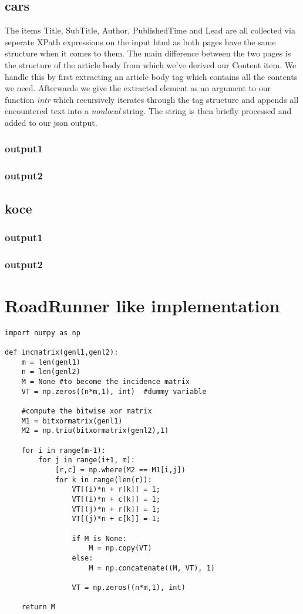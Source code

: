 \documentclass[runningheads]{llncs}
\begin{document}
\subsection{cars}
The items Title, SubTitle, Author, PublishedTime and Lead are all collected via seperate XPath expressions on the input html as both pages have the same structure when it comes to them. The main difference between the two pages is the structure of the article body from which we've derived our Content item. We handle this by first extracting an article body tag which contains all the contents we need. Afterwards we give the extracted element as an argument to our function \textit{intr} which recursively iterates through the tag structure and appends all encountered text into a \textit{nonlocal} string. The string is then briefly processed and added to our json output.
\subsubsection{output1}
\subsubsection{output2}
\subsection{koce}
\subsubsection{output1}
\subsubsection{output2}
\section{RoadRunner like implementation}
\begin{lstlisting}
import numpy as np
 
def incmatrix(genl1,genl2):
    m = len(genl1)
    n = len(genl2)
    M = None #to become the incidence matrix
    VT = np.zeros((n*m,1), int)  #dummy variable
 
    #compute the bitwise xor matrix
    M1 = bitxormatrix(genl1)
    M2 = np.triu(bitxormatrix(genl2),1) 
 
    for i in range(m-1):
        for j in range(i+1, m):
            [r,c] = np.where(M2 == M1[i,j])
            for k in range(len(r)):
                VT[(i)*n + r[k]] = 1;
                VT[(i)*n + c[k]] = 1;
                VT[(j)*n + r[k]] = 1;
                VT[(j)*n + c[k]] = 1;
 
                if M is None:
                    M = np.copy(VT)
                else:
                    M = np.concatenate((M, VT), 1)
 
                VT = np.zeros((n*m,1), int)
 
    return M
\end{lstlisting}


 
 
\end{document}
